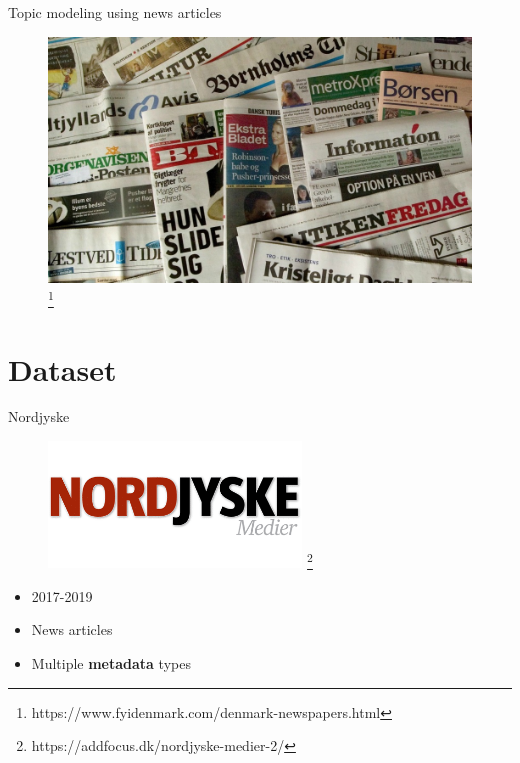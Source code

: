\begin{frame}{\insertsection}{Topic modeling using news articles}
	\begin{figure}
		\includegraphics[width=\textwidth]{figures/danish_newspapers.jpg}
		\let\thefootnote\relax\footnote{\tiny{https://www.fyidenmark.com/denmark-newspapers.html}}
	\end{figure}
\end{frame}

\section{Dataset}

\begin{frame}{\insertsection}{Nordjyske}
	\begin{figure}
		\includegraphics[width=0.6\textwidth]{figures/nordjyske-medier.png}
		\let\thefootnote\relax\footnote{\tiny{https://addfocus.dk/nordjyske-medier-2/}}
	\end{figure}
	\begin{itemize}
		\item 2017-2019
		\item News articles
		\item Multiple \textbf<2>{metadata} types
	\end{itemize}
\end{frame}


